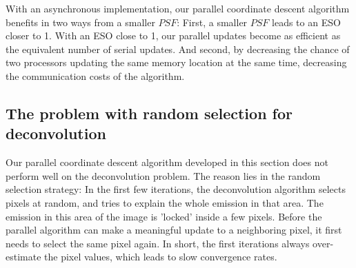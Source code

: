 
With an asynchronous implementation, our parallel coordinate descent algorithm benefits in two ways from a smaller $PSF$: First, a smaller $PSF$ leads to an ESO closer to 1. With an ESO close to 1, our parallel updates become as efficient as the equivalent number of serial updates. And second, by decreasing the chance of two processors updating the same memory location at the same time, decreasing the communication costs of the algorithm.


\subsection{The problem with random selection for deconvolution} \label{pcdm:adaption}
Our parallel coordinate descent algorithm developed in this section does not perform well on the deconvolution problem. The reason lies in the random selection strategy: In the first few iterations, the deconvolution algorithm selects pixels at random, and tries to explain the whole emission in that area. The emission in this area of the image is 'locked' inside a few pixels. Before the parallel algorithm can make a meaningful update to a neighboring pixel, it first needs to select the same pixel again. In short, the first iterations always over-estimate the pixel values, which leads to slow convergence rates. 

